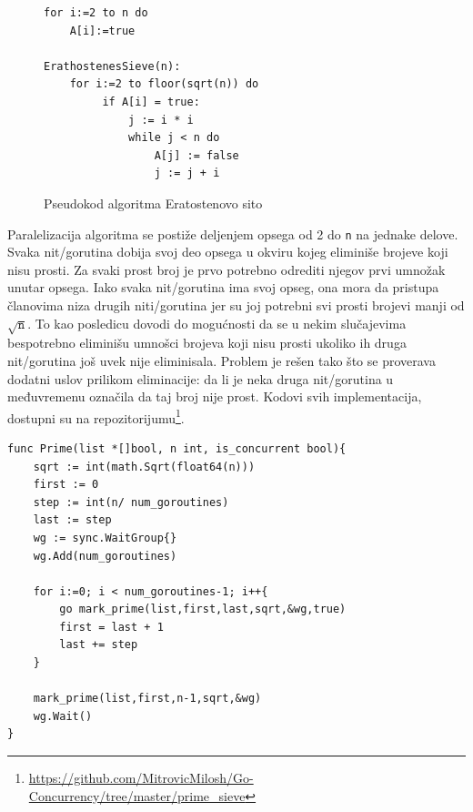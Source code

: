 \documentclass[12pt,oneside]{memoir}
\begin{document}
\begin{figure}
\begin{center}

\begin{Verbatim}[fontsize=\small]
for i:=2 to n do
    A[i]:=true

ErathostenesSieve(n):
    for i:=2 to floor(sqrt(n)) do 
         if A[i] = true:
             j := i * i
             while j < n do
                 A[j] := false 
                 j := j + i
\end{Verbatim}

\caption{Pseudokod algoritma Eratostenovo sito}
\label{fig:prime_pseudo}
\end{center}
\end{figure}

Paralelizacija algoritma se postiže deljenjem opsega od 2 do \texttt{n} na jednake delove. Svaka nit/gorutina dobija svoj deo opsega u okviru kojeg eliminiše brojeve koji nisu prosti. Za svaki prost broj je prvo potrebno odrediti njegov prvi umnožak unutar opsega. Iako svaka nit/gorutina ima svoj opseg, ona mora da pristupa članovima niza drugih niti/gorutina jer su joj potrebni svi prosti brojevi manji od $\sqrt{\texttt{n}}$. To kao posledicu dovodi do mogućnosti da se u nekim slučajevima bespotrebno eliminišu umnošci brojeva koji nisu prosti ukoliko ih druga nit/gorutina još uvek nije eliminisala. Problem je rešen tako što se proverava dodatni uslov prilikom eliminacije: da li je neka druga nit/gorutina u međuvremenu označila da taj broj nije prost. Kodovi svih implementacija, dostupni su na repozitorijumu\footnote{\url{https://github.com/MitrovicMilosh/Go-Concurrency/tree/master/prime_sieve}}.

\begin{center}
\begin{lstlisting}[caption=Go implementacija konkurentne funkcije za određivanje prostih brojeva manjih od n,label={lst:prime1},backgroundcolor=\color{background}]
func Prime(list *[]bool, n int, is_concurrent bool){
	sqrt := int(math.Sqrt(float64(n)))
	first := 0
	step := int(n/ num_goroutines)
	last := step
	wg := sync.WaitGroup{}
	wg.Add(num_goroutines)

	for i:=0; i < num_goroutines-1; i++{
		go mark_prime(list,first,last,sqrt,&wg,true)
		first = last + 1
		last += step
	}

	mark_prime(list,first,n-1,sqrt,&wg)
	wg.Wait()
}
\end{lstlisting}
\end{center}
\end{document}
